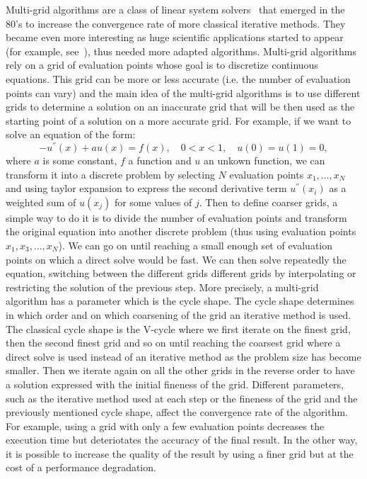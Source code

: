 \documentclass[10pt,conference]{IEEEtran}
\begin{document}
Multi-grid algorithms are a class of linear system solvers~\cite{Hackbusch1991} that emerged in the 80's to increase the convergence rate of more classical iterative methods. They became even more
interesting as huge scientific applications started to appear (for example, see~\cite{Ashby1996}), thus needed more adapted algorithms. Multi-grid algorithms rely on a grid of evaluation points whose goal is to discretize continuous equations.
This grid can be more or less accurate (i.e.
the number of evaluation points can vary) and the main idea of the multi-grid algorithms is to use different grids to determine a solution on an inaccurate grid that will be then used as the starting point of a solution on a more accurate grid. For example, if we want to solve an equation of the form:
\[ -u^{''}(x)+au(x) = f(x),\quad 0<x<1, \quad u(0)=u(1)=0, \]
where $a$ is some constant, $f$ a function and $u$ an unkown function, we can transform it into a discrete problem by selecting $N$ evaluation points $x_1,\dots,x_N$ and using taylor expansion to express the second derivative term $u^{''}(x_i)$ as a weighted sum of $u(x_j)$ for some values of $j$. Then
to define coarser grids, a simple way to do it is to divide the number of evaluation points and transform the original equation into another discrete problem (thus using evaluation points $x_1,x_3,\dots,x_N$). We can go on until reaching a small enough set of evaluation points on which a direct solve would be fast. We can then solve repeatedly the equation, switching between the different grids different grids by interpolating or restricting the solution of the previous step.
More precisely, a multi-grid algorithm has a parameter which is the cycle shape.
The cycle shape determines in which order and on which coarsening of the grid an iterative method is used. The classical cycle shape is the V-cycle where we first iterate on the finest grid, then the second finest grid and so on until reaching
the coarsest grid where a direct solve is used instead of an iterative method as the problem size has become smaller. Then we iterate again on all the other grids in the reverse order to have a solution expressed with the initial fineness of the grid.
Different parameters, such as the iterative method used at each step or the fineness of the grid and the previously mentioned cycle shape, affect the convergence rate of the algorithm. For example, using a grid with only a few
evaluation points decreases the execution time but deteriotates the accuracy of the final result. In the other way, it is possible to increase the quality of the result by using a finer
grid but at the cost of a performance degradation.
\end{document}

